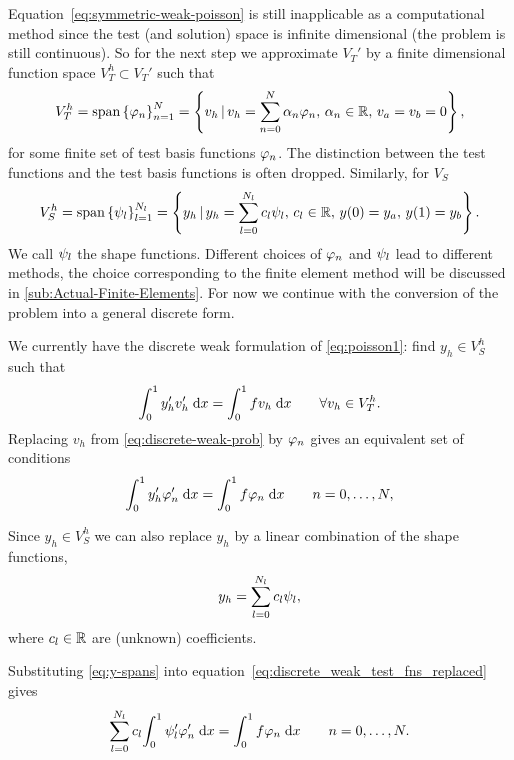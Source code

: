 Equation~\eqref{eq:symmetric-weak-poisson} is still inapplicable as a computational method since the test (and solution) space is infinite dimensional (\ie the problem is still continuous).
So for the next step we approximate $V_{T}'$ by a finite dimensional function space $V_{T}^{h}\subset V_{T}'$ such that
\begin{equation}
  V_{T}^{h}=\text{span} \left\{ { \varphi_{n} } \right\}_{n=1}^{N}
  = \left\{ {v_h \,|\, v_h = \sum_{n=0}^{N}\alpha_{n} \varphi_{n},\, \alpha_{n} \in \mathbb{R},\,
    v_a = v_b =0 } \right\},
  \label{eq:30}
\end{equation}
for some finite set of test basis functions $\varphi_{n}$.
The distinction between the test functions and the test basis functions is often dropped.
Similarly, for $V_S$
\begin{equation}
  \label{eq:34}
  V_{S}^{h}=\text{span} \left\{ { \psi_{l} } \right\}_{l=1}^{N_l}
  = \left\{ {y_h \,|\, y_h = \sum_{l=0}^{N_l}c_{l} \psi_{l},\, c_{l} \in \mathbb{R},\,
    y(0) = y_a,\, y(1) = y_b } \right\}.
\end{equation}
We call $\psi_l$ the shape functions.
Different choices of $\varphi_{n}$ and $\psi_l$ lead to different methods, the choice corresponding to the finite element method will be discussed in \autoref{sub:Actual-Finite-Elements}.
For now we continue with the conversion of the problem into a general discrete form.

We currently have the discrete weak formulation of \eqref{eq:poisson1}: find $y_{h}\in V_{S}^{h}$ such that
\begin{equation}
  {\int_0^1  y'_{h}v_{h}'  {\; \text{d}}{x}} ={\int_0^1  fv_{h}  {\; \text{d}}{x}} \qquad\forall v_{h}\in V_{T}^{h}.
  \label{eq:discrete-weak-prob}
\end{equation}
Replacing $v_{h}$ from \eqref{eq:discrete-weak-prob} by $\varphi_{n}$ gives an equivalent set of conditions
\begin{equation}
  {\int_0^1   y'_{h} \varphi_{n}'   {\; \text{d}}{x}}  = {\int_0^1  f\varphi_{n}  {\; \text{d}}{x}} \qquad n=0,\ldots,N,
  \label{eq:discrete_weak_test_fns_replaced}
\end{equation}

Since $y_{h}\in V_{S}^{h}$ we can also replace $y_{h}$ by a linear combination of the shape functions, \ie
\begin{equation}
  y_{h}=\sum_{l=0}^{N_l}c_{l}\psi_{l},
  \label{eq:y-spans}
\end{equation}
where $c_l \in \mathbb{R}$ are (unknown) coefficients.

Substituting \eqref{eq:y-spans} into equation~\eqref{eq:discrete_weak_test_fns_replaced} gives
\begin{equation}
  \sum_{l=0}^{N_l}c_{l}{\int_0^1  \psi_{l}'\varphi'_{n}  {\; \text{d}}{x}} ={\int_0^1  f\varphi_{n}  {\; \text{d}}{x}} 
  \qquad n=0,\ldots,N.
  \label{eq:31}
\end{equation}

